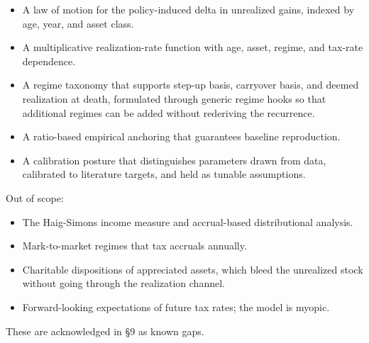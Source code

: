 \documentclass[11pt]{article}
\begin{document}
\begin{itemize}
  \item A law of motion for the policy-induced delta in unrealized gains, indexed
    by age, year, and asset class.
\end{itemize}
\begin{itemize}
  \item A multiplicative realization-rate function with age, asset, regime, and
    tax-rate dependence.
\end{itemize}
\begin{itemize}
  \item A regime taxonomy that supports step-up basis, carryover basis, and deemed
    realization at death, formulated through generic regime hooks so that
    additional regimes can be added without rederiving the recurrence.
\end{itemize}
\begin{itemize}
  \item A ratio-based empirical anchoring that guarantees baseline reproduction.
\end{itemize}
\begin{itemize}
  \item A calibration posture that distinguishes parameters drawn from data,
    calibrated to literature targets, and held as tunable assumptions.
\end{itemize}

Out of scope:

\begin{itemize}
  \item The Haig-Simons income measure and accrual-based distributional analysis.
\end{itemize}
\begin{itemize}
  \item Mark-to-market regimes that tax accruals annually.
\end{itemize}
\begin{itemize}
  \item Charitable dispositions of appreciated assets, which bleed the unrealized
    stock without going through the realization channel.
\end{itemize}
\begin{itemize}
  \item Forward-looking expectations of future tax rates; the model is myopic.
\end{itemize}

These are acknowledged in §9 as known gaps.
\end{document}
